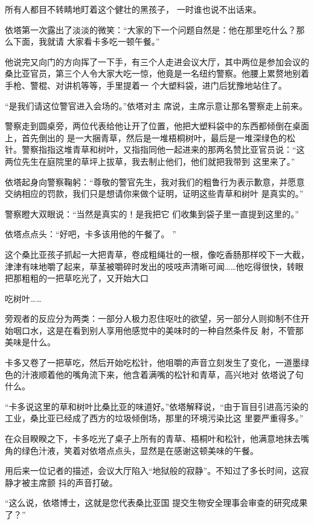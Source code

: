 \documentclass{article}
\begin{document}
所有人都目不转睛地盯着这个健壮的黑孩子，
一时谁也说不出话来。 

依塔第一次露出了淡淡的微笑：“大家的下一个问题自然是：他在那里吃什么？那么下面，我就请
大家看卡多吃一顿午餐。” 

他说完又向门的方向挥了一下手，有三个人走进会议大厅，其中两位是参加会议的桑比亚官员，第三个人令大家大吃一惊，他竟是一名纽约警察。他腰上累赘地别着手枪、警棍、对讲机等等，手里提着一
个大塑料袋，进门后犹豫地站住了。 

“是我们请这位警官进入会场的。”依塔对主
席说，主席示意让那名警察走上前来。 

警察走到圆桌旁，两位代表给他让开了位置，他把大塑料袋中的东西都倾倒在桌面上，首先倒出的
\newpage
是一大捆青草，然后是一堆梧桐树叶，最后是一堆深绿色的松针。警察指指这堆青草和树叶，又指指同他一起进来的那两名赞比亚官员说：“这两位先生在庭院里的草坪上拔草，我去制止他们，他们就把我带到
这里来了。” 

依塔起身向警察鞠躬：“尊敬的警官先生，我对我们的粗鲁行为表示歉意，并愿意交纳相应的罚款，我们只是想请你来做个证明，证明这些青草和树叶
是真实的。” 

警察瞪大双眼说：“当然是真实的！是我把它
们收集到袋子里一直提到这里的。” 

依塔点点头：“好吧，卡多该用他的午餐了。
” 

这个桑比亚孩子抓起一大把青草，卷成粗绳壮的一根，像吃香肠那样咬下一大截，津津有味地嚼了起来，草茎被嚼碎时发出的吱吱声清晰可闻……他吃得很快，转眼把那粗粗的一把草吃光了，又开始大口
\newpage

吃树叶…… 

旁观者的反应分为两类：一部分人极力忍住呕吐的欲望，另一部分人则抑制不住开始咽口水，这是在看到别人享用他感觉中的美味时的一种自然条件反
射，不管那美味是什么。 

卡多又卷了一把草吃，然后开始吃松针，他咀嚼的声音立刻发生了变化，一道墨绿色的汁液顺着他的嘴角流下来，他含着满嘴的松针和青草，高兴地对
依塔说了句什么。 

“卡多说这里的草和树叶比桑比亚的味道好。”依塔解释说，“由于盲目引进高污染的工业，桑比亚已经成了西方的垃圾倾倒场，那里的环境污染比这
里要严重得多。” 

在众目睽睽之下，卡多吃光了桌子上所有的青草、梧桐叶和松针，他满意地抹去嘴角的绿色汁液，笑着对依塔点点头，显然是在感谢这顿美味的午餐。

\newpage

用后来一位记者的描述，会议大厅陷入“地狱般的寂静”。不知过了多长时间，这寂静才被主席颤
抖的声音打破。 

“这么说，依塔博士，这就是您代表桑比亚国
提交生物安全理事会审查的研究成果了？” 
\end{document}
